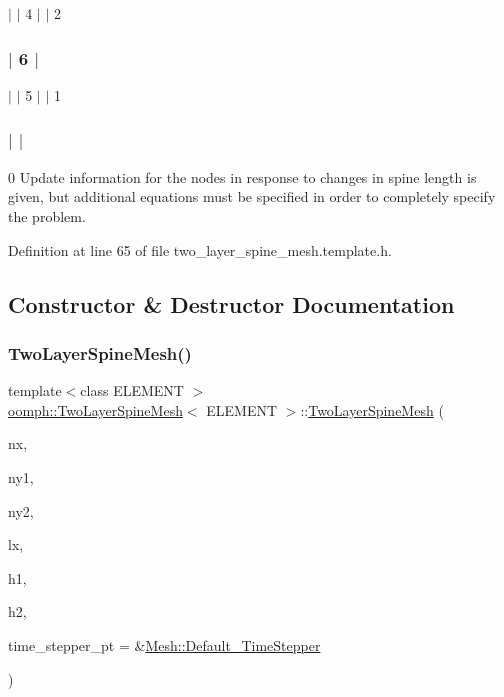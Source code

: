 $\vert$ $\vert$ 4 $\vert$ $\vert$ 2 \subsubsection*{$\vert$ 6 $\vert$ }

$\vert$ $\vert$ 5 $\vert$ $\vert$ 1 \subsubsection*{$\vert$ $\vert$ }

0 Update information for the nodes in response to changes in spine length is given, but additional equations must be specified in order to completely specify the problem. 

Definition at line 65 of file two\+\_\+layer\+\_\+spine\+\_\+mesh.\+template.\+h.



\subsection{Constructor \& Destructor Documentation}
\mbox{\label{classoomph_1_1TwoLayerSpineMesh_a0c41a93e9ccaaa34956215e64611be2a}} 
\subsubsection{\texorpdfstring{Two\+Layer\+Spine\+Mesh()}{TwoLayerSpineMesh()}\hspace{0.1cm}{\footnotesize\ttfamily [1/3]}}
{\footnotesize\ttfamily template$<$class E\+L\+E\+M\+E\+NT $>$ \\
\hyperlink{classoomph_1_1TwoLayerSpineMesh}{oomph\+::\+Two\+Layer\+Spine\+Mesh}$<$ E\+L\+E\+M\+E\+NT $>$\+::\hyperlink{classoomph_1_1TwoLayerSpineMesh}{Two\+Layer\+Spine\+Mesh} (\begin{DoxyParamCaption}\item[{const unsigned \&}]{nx,  }\item[{const unsigned \&}]{ny1,  }\item[{const unsigned \&}]{ny2,  }\item[{const double \&}]{lx,  }\item[{const double \&}]{h1,  }\item[{const double \&}]{h2,  }\item[{\hyperlink{classoomph_1_1TimeStepper}{Time\+Stepper} $\ast$}]{time\+\_\+stepper\+\_\+pt = {\ttfamily \&\hyperlink{classoomph_1_1Mesh_a12243d0fee2b1fcee729ee5a4777ea10}{Mesh\+::\+Default\+\_\+\+Time\+Stepper}} }\end{DoxyParamCaption})}



